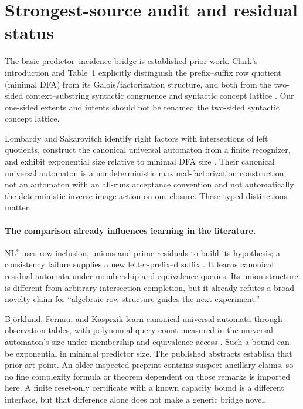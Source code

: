 \documentclass[11pt]{article}
\theoremstyle{remark}
\begin{document}
\section{Strongest-source audit and residual status}
\label{sec:sources}

The basic predictor--incidence bridge is established prior work. Clark's introduction and Table~1 explicitly distinguish the prefix--suffix row quotient (minimal DFA) from its Galois/factorization structure, and both from the two-sided context--substring syntactic congruence and syntactic concept lattice \cite{Clark}. Our one-sided extents and intents should not be renamed the two-sided syntactic concept lattice.

Lombardy and Sakarovitch identify right factors with intersections of left quotients, construct the canonical universal automaton from a finite recognizer, and exhibit exponential size relative to minimal DFA size \cite{Universal}. Their canonical universal automaton is a nondeterministic maximal-factorization construction, not an automaton with an all-runs acceptance convention and not automatically the deterministic inverse-image action on our closure. These typed distinctions matter.

\paragraph{The comparison already influences learning in the literature.}
NL$^*$ uses row inclusion, unions and prime residuals to build its hypothesis; a consistency failure supplies a new letter-prefixed suffix \cite{NLstar}. It learns canonical residual automata under membership and equivalence queries. Its union structure is different from arbitrary intersection completion, but it already refutes a broad novelty claim for ``algebraic row structure guides the next experiment.''

Björklund, Fernau, and Kasprzik learn canonical universal automata through observation tables, with polynomial query count measured in the universal automaton's size under membership and equivalence access \cite{UALearning}. Such a bound can be exponential in minimal predictor size. The published abstracts establish that prior-art point. An older inspected preprint contains suspect ancillary claims, so no fine complexity formula or theorem dependent on those remarks is imported here. A finite reset-only certificate with a known capacity bound is a different interface, but that difference alone does not make a generic bridge novel.
\end{document}
